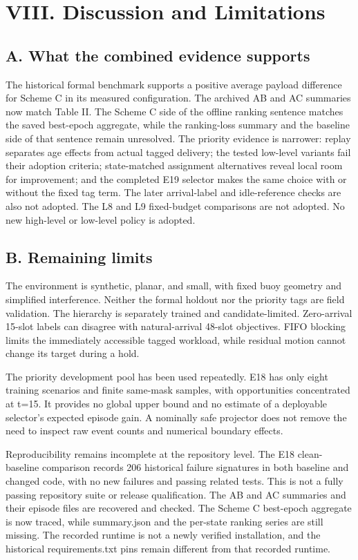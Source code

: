 \section*{VIII. Discussion and Limitations}

\subsection*{A. What the combined evidence supports}

The historical formal benchmark supports a positive average payload difference for Scheme C in its measured configuration. The archived AB and AC summaries now match Table II. The Scheme C side of the offline ranking sentence matches the saved best-epoch aggregate, while the ranking-loss summary and the baseline side of that sentence remain unresolved. The priority evidence is narrower: replay separates age effects from actual tagged delivery; the tested low-level variants fail their adoption criteria; state-matched assignment alternatives reveal local room for improvement; and the completed E19 selector makes the same choice with or without the fixed tag term. The later arrival-label and idle-reference checks are also not adopted. The L8 and L9 fixed-budget comparisons are not adopted. No new high-level or low-level policy is adopted.

\subsection*{B. Remaining limits}

The environment is synthetic, planar, and small, with fixed buoy geometry and simplified interference. Neither the formal holdout nor the priority tags are field validation. The hierarchy is separately trained and candidate-limited. Zero-arrival 15-slot labels can disagree with natural-arrival 48-slot objectives. FIFO blocking limits the immediately accessible tagged workload, while residual motion cannot change its target during a hold.

The priority development pool has been used repeatedly. E18 has only eight training scenarios and finite same-mask samples, with opportunities concentrated at t=15. It provides no global upper bound and no estimate of a deployable selector's expected episode gain. A nominally safe projector does not remove the need to inspect raw event counts and numerical boundary effects.

Reproducibility remains incomplete at the repository level. The E18 clean-baseline comparison records 206 historical failure signatures in both baseline and changed code, with no new failures and passing related tests. This is not a fully passing repository suite or release qualification. The AB and AC summaries and their episode files are recovered and checked. The Scheme C best-epoch aggregate is now traced, while summary.json and the per-state ranking series are still missing. The recorded runtime is not a newly verified installation, and the historical requirements.txt pins remain different from that recorded runtime.

